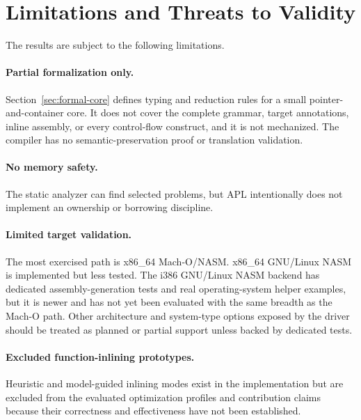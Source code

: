 \documentclass[10pt,twocolumn]{article}
\begin{document}
\section{Limitations and Threats to Validity}

\par The results are subject to the following limitations.

\paragraph{Partial formalization only.}
\par Section~\ref{sec:formal-core} defines typing and reduction rules for a small pointer-and-container core. It does not cover the complete grammar, target annotations, inline assembly, or every control-flow construct, and it is not mechanized. The compiler has no semantic-preservation proof or translation validation.

\paragraph{No memory safety.}
\par The static analyzer can find selected problems, but APL intentionally does not implement an ownership or borrowing discipline.

\paragraph{Limited target validation.}
\par The most exercised path is x86\_64 Mach-O/NASM. x86\_64 GNU/Linux NASM is implemented but less tested. The i386 GNU/Linux NASM backend has dedicated assembly-generation tests and real operating-system helper examples, but it is newer and has not yet been evaluated with the same breadth as the Mach-O path. Other architecture and system-type options exposed by the driver should be treated as planned or partial support unless backed by dedicated tests.

\paragraph{Excluded function-inlining prototypes.}
\par Heuristic and model-guided inlining modes exist in the implementation but are excluded from the evaluated optimization profiles and contribution claims because their correctness and effectiveness have not been established.
\end{document}
